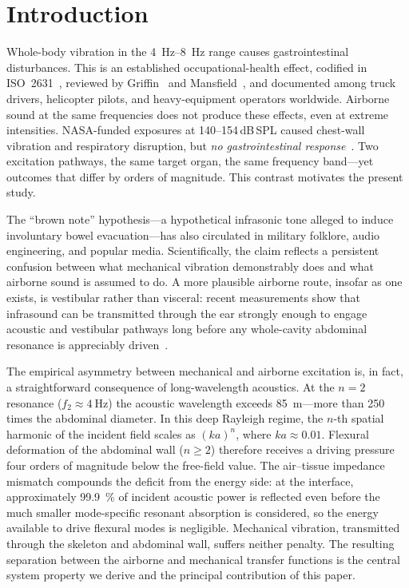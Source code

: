 \section{Introduction}
\label{sec:introduction}

Whole-body vibration in the \SIrange{4}{8}{\hertz} range causes
gastrointestinal disturbances.  This is an established occupational-health
effect, codified in ISO~2631~\cite{iso2631}, reviewed by
Griffin~\cite{Griffin1990} and Mansfield~\cite{mansfield2005human},
and documented among truck drivers, helicopter pilots, and heavy-equipment
operators worldwide.  Airborne sound at the same frequencies does not produce
these effects, even at extreme intensities.  NASA-funded exposures at
140--154\,dB\,SPL caused chest-wall vibration and respiratory disruption, but
\emph{no gastrointestinal response}~\cite{Mohr1965}.  Two
excitation pathways, the same target organ, the same frequency band---yet
outcomes that differ by orders of magnitude.  This contrast motivates the
present study.

The ``brown note'' hypothesis---a hypothetical infrasonic tone alleged to
induce involuntary bowel evacuation---has also circulated in military
folklore, audio engineering, and popular media.  Scientifically,
the claim reflects a persistent confusion between what mechanical vibration
demonstrably does and what airborne sound is assumed to do.  A more plausible
airborne route, insofar as one exists, is
vestibular rather than visceral: recent measurements show that infrasound can
be transmitted through the ear strongly enough to engage acoustic and
vestibular pathways long before any whole-cavity abdominal resonance is
appreciably driven~\cite{Raufer2018}.

The empirical asymmetry between mechanical and airborne excitation is, in
fact, a straightforward consequence of long-wavelength acoustics.  At
the $n{=}2$ resonance ($f_2 \approx \SI{4}{\hertz}$) the acoustic wavelength
exceeds \SI{85}{\metre}---more than 250 times the abdominal diameter.  In
this deep Rayleigh regime, the $n$-th spatial harmonic of the incident field
scales as $(ka)^n$, where $ka \approx 0.01$.  Flexural deformation of the
abdominal wall ($n \geq 2$) therefore receives a driving pressure four orders
of magnitude below the free-field value.  The air--tissue impedance mismatch
compounds the deficit from the energy side: at the interface, approximately
\SI{99.9}{\percent} of incident acoustic power is reflected even before the
much smaller mode-specific resonant absorption is considered, so the energy
available to drive flexural modes is negligible.  Mechanical
vibration, transmitted through the skeleton and abdominal wall, suffers
neither penalty.  The resulting separation between the airborne and mechanical
transfer functions is the central system property we derive and the principal
contribution of this paper.

